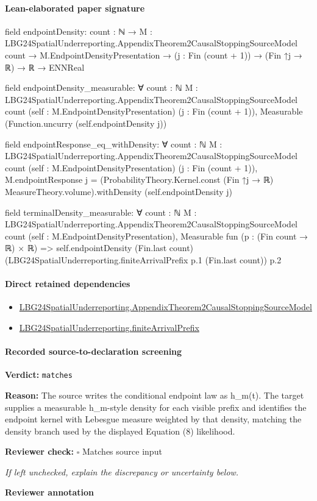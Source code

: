 \documentclass[10pt]{article}
\newcommand{\reviewerbox}{%
  \par\noindent\fbox{\parbox{0.96\linewidth}{\rule{0pt}{0.38in}}}\par
}
\newcommand{\reviewmatch}[1]{%
  \par\noindent\textbf{Reviewer check:} $\square$\; #1\par
  \noindent\emph{If left unchecked, explain the discrepancy or uncertainty below.}\par
}
\begin{document}
\paragraph{Lean-elaborated paper signature}
\begin{ReviewVerbatim}
field endpointDensity:
{count : ℕ} →
  {M : LBG24SpatialUnderreporting.AppendixTheorem2CausalStoppingSourceModel count} →
    M.EndpointDensityPresentation → (j : Fin (count + 1)) → (Fin ↑j → ℝ) → ℝ → ENNReal

field endpointDensity_measurable:
∀ {count : ℕ} {M : LBG24SpatialUnderreporting.AppendixTheorem2CausalStoppingSourceModel count}
  (self : M.EndpointDensityPresentation) (j : Fin (count + 1)), Measurable (Function.uncurry (self.endpointDensity j))

field endpointResponse_eq_withDensity:
∀ {count : ℕ} {M : LBG24SpatialUnderreporting.AppendixTheorem2CausalStoppingSourceModel count}
  (self : M.EndpointDensityPresentation) (j : Fin (count + 1)),
  M.endpointResponse j =
    (ProbabilityTheory.Kernel.const (Fin ↑j → ℝ) MeasureTheory.volume).withDensity (self.endpointDensity j)

field terminalDensity_measurable:
∀ {count : ℕ} {M : LBG24SpatialUnderreporting.AppendixTheorem2CausalStoppingSourceModel count}
  (self : M.EndpointDensityPresentation),
  Measurable fun (p : (Fin count → ℝ) × ℝ) =>
    self.endpointDensity (Fin.last count) (LBG24SpatialUnderreporting.finiteArrivalPrefix p.1 (Fin.last count)) p.2
\end{ReviewVerbatim}

\paragraph{Direct retained dependencies}
\begin{itemize}\raggedright
\item \hyperlink{paper-prerequisite-2f0b30d7fa1d57d0}{LBG24\allowbreak{}Spatial\allowbreak{}Underreporting.\allowbreak{}Appendix\allowbreak{}Theorem2\allowbreak{}Causal\allowbreak{}Stopping\allowbreak{}Source\allowbreak{}Model}
\item \hyperlink{governing-declaration-29c2f9ef07a8b8ce}{LBG24\allowbreak{}Spatial\allowbreak{}Underreporting.\allowbreak{}finite\allowbreak{}Arrival\allowbreak{}Prefix}
\end{itemize}
\paragraph{Recorded source-to-declaration screening}
\textbf{Verdict:} \texttt{matches}
\\
{\raggedright
\textbf{Reason:} The source writes the conditional endpoint law as h\_\allowbreak{}m(t).\allowbreak{} The target supplies a measurable h\_\allowbreak{}m-\allowbreak{}style density for each visible prefix and identifies the endpoint kernel with Lebesgue measure weighted by that density, matching the density branch used by the displayed Equation (8) likelihood.\allowbreak{}
\par}
\reviewmatch{Matches source input}
\noindent\textbf{Reviewer annotation}\par
\reviewerbox
\clearpage
\hypertarget{paper-prerequisite-8b45cca115cdd2d8}{}
\end{document}
